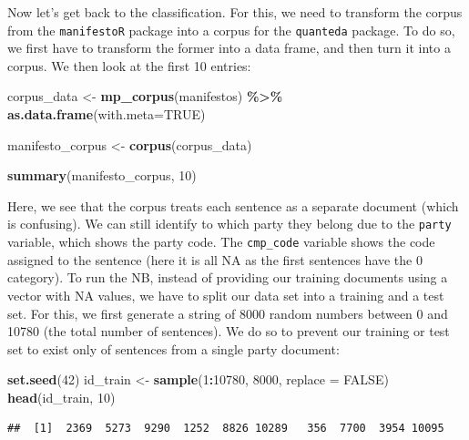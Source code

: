\documentclass[
]{book}
\newenvironment{Shaded}{\begin{snugshade}}{\end{snugshade}}
\newcommand{\AttributeTok}[1]{\textcolor[rgb]{0.13,0.29,0.53}{#1}}
\newcommand{\ConstantTok}[1]{\textcolor[rgb]{0.56,0.35,0.01}{#1}}
\newcommand{\DecValTok}[1]{\textcolor[rgb]{0.00,0.00,0.81}{#1}}
\newcommand{\FunctionTok}[1]{\textcolor[rgb]{0.13,0.29,0.53}{\textbf{#1}}}
\newcommand{\NormalTok}[1]{#1}
\newcommand{\OtherTok}[1]{\textcolor[rgb]{0.56,0.35,0.01}{#1}}
\newcommand{\SpecialCharTok}[1]{\textcolor[rgb]{0.81,0.36,0.00}{\textbf{#1}}}
\begin{document}
Now let's get back to the classification. For this, we need to transform the corpus from the \texttt{manifestoR} package into a corpus for the \texttt{quanteda} package. To do so, we first have to transform the former into a data frame, and then turn it into a corpus. We then look at the first 10 entries:

\begin{Shaded}
\begin{Highlighting}[]
\NormalTok{corpus\_data }\OtherTok{\textless{}{-}} \FunctionTok{mp\_corpus}\NormalTok{(manifestos) }\SpecialCharTok{\%\textgreater{}\%} 
 \FunctionTok{as.data.frame}\NormalTok{(}\AttributeTok{with.meta=}\ConstantTok{TRUE}\NormalTok{)}

\NormalTok{manifesto\_corpus }\OtherTok{\textless{}{-}} \FunctionTok{corpus}\NormalTok{(corpus\_data)}

\FunctionTok{summary}\NormalTok{(manifesto\_corpus, }\DecValTok{10}\NormalTok{)}
\end{Highlighting}
\end{Shaded}

Here, we see that the corpus treats each sentence as a separate document (which is confusing). We can still identify to which party they belong due to the \texttt{party} variable, which shows the party code. The \texttt{cmp\_code} variable shows the code assigned to the sentence (here it is all NA as the first sentences have the 0 category). To run the NB, instead of providing our training documents using a vector with NA values, we have to split our data set into a training and a test set. For this, we first generate a string of 8000 random numbers between 0 and 10780 (the total number of sentences). We do so to prevent our training or test set to exist only of sentences from a single party document:

\begin{Shaded}
\begin{Highlighting}[]
\FunctionTok{set.seed}\NormalTok{(}\DecValTok{42}\NormalTok{)}
\NormalTok{id\_train }\OtherTok{\textless{}{-}} \FunctionTok{sample}\NormalTok{(}\DecValTok{1}\SpecialCharTok{:}\DecValTok{10780}\NormalTok{, }\DecValTok{8000}\NormalTok{, }\AttributeTok{replace =} \ConstantTok{FALSE}\NormalTok{)}
\FunctionTok{head}\NormalTok{(id\_train, }\DecValTok{10}\NormalTok{)}
\end{Highlighting}
\end{Shaded}

\begin{verbatim}
##  [1]  2369  5273  9290  1252  8826 10289   356  7700  3954 10095
\end{verbatim}
\end{document}
